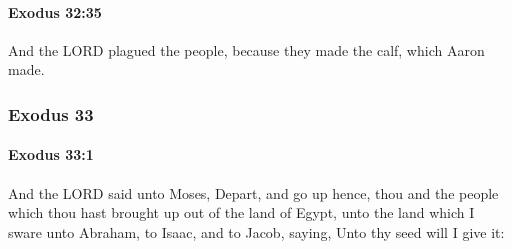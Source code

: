 		\paragraph{Exodus 32:35} %
			\label{EXODUS-32-35}

			And the LORD plagued the people, because they made the calf, which Aaron made.

	\subsubsection{Exodus 33} %
		\label{EXODUS-33}

		\paragraph{Exodus 33:1} %
			\label{EXODUS-33-1}

			And the LORD said unto Moses, Depart, and go up hence, thou and the people which thou hast brought up out of the land of Egypt, unto the land which I sware unto Abraham, to Isaac, and to Jacob, saying, Unto thy seed will I give it:

